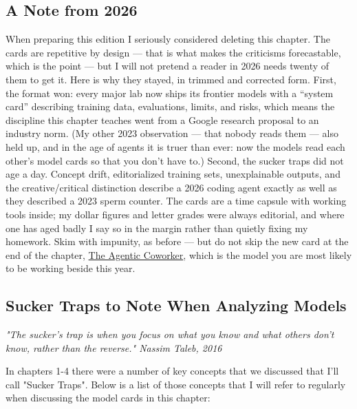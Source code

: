 \subsection{A Note from 2026}

When preparing this edition I seriously considered deleting this chapter. The cards are repetitive by design --- that is what makes the criticisms forecastable, which is the point --- but I will not pretend a reader in 2026 needs twenty of them to get it. Here is why they stayed, in trimmed and corrected form. First, the format won: every major lab now ships its frontier models with a ``system card'' describing training data, evaluations, limits, and risks, which means the discipline this chapter teaches went from a Google research proposal to an industry norm. (My other 2023 observation --- that nobody reads them --- also held up, and in the age of agents it is truer than ever: now the models read each other's model cards so that you don't have to.) Second, the sucker traps did not age a day. Concept drift, editorialized training sets, unexplainable outputs, and the creative/critical distinction describe a 2026 coding agent exactly as well as they described a 2023 sperm counter. The cards are a time capsule with working tools inside; my dollar figures and letter grades were always editorial, and where one has aged badly I say so in the margin rather than quietly fixing my homework. Skim with impunity, as before --- but do not skip the new card at the end of the chapter, \hyperref[sec:agentcard]{The Agentic Coworker}, which is the model you are most likely to be working beside this year.

\subsection{Sucker Traps to Note When Analyzing Models}

\textit{"The sucker's trap is when you focus on what you know and what others don't know, rather than the reverse." Nassim Taleb, 2016}\cite{procrustes}

In chapters 1-4 there were a number of key concepts that we discussed that I'll call "Sucker Traps". Below is a list of those concepts that I will refer to regularly when discussing the model cards in this chapter:

